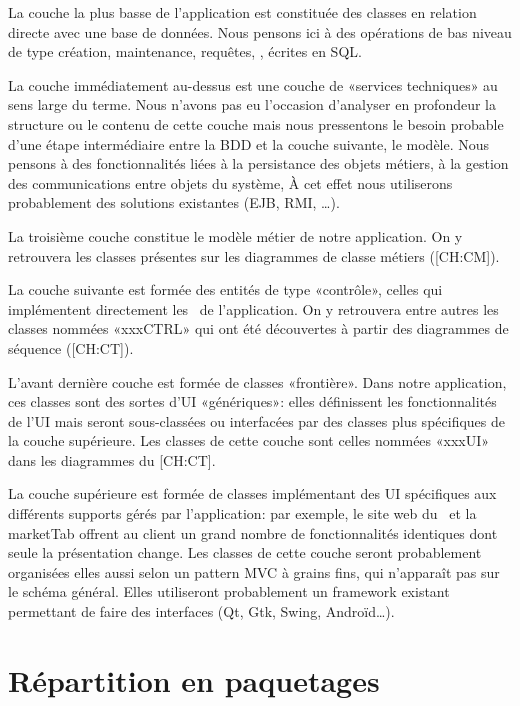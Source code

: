 \startitemize
\item La couche la plus basse de l'application est constituée des classes en relation directe avec une base de données. 
Nous pensons ici à des opérations de bas niveau de type création, maintenance, requêtes, \etc, écrites en SQL.
\item La couche immédiatement au-dessus est une couche de «services techniques» au sens large du terme.
Nous n'avons pas eu l'occasion d'analyser en profondeur la structure ou le contenu de cette couche mais nous pressentons le besoin probable d'une étape intermédiaire entre la BDD et la couche suivante, le modèle.
Nous pensons à des fonctionnalités liées à la persistance des objets métiers, à la gestion des communications entre objets du système, \etc 
À cet effet nous utiliserons probablement des solutions existantes (EJB, RMI, \dots).\par
\item La troisième couche constitue le modèle métier de notre application.
On y retrouvera les classes présentes sur les diagrammes de classe métiers ([CH:CM]).
\item La couche suivante est formée des entités de type «contrôle», \cad celles qui implémentent directement les \cu\ de l'application.
On y retrouvera entre autres les classes nommées «xxxCTRL» qui ont été découvertes à partir des diagrammes de séquence ([CH:CT]).
\item L'avant dernière couche est formée de classes «frontière». 
Dans notre application, ces classes sont des sortes d'UI «génériques»: elles définissent les fonctionnalités de l'UI mais seront sous-classées ou interfacées par des classes plus spécifiques de la couche supérieure.
Les classes de cette couche sont celles nommées «xxxUI» dans les diagrammes du [CH:CT].
\item La couche supérieure est formée de classes implémentant des UI spécifiques aux différents supports gérés par l'application: par exemple, le site web du \fm\ et la marketTab offrent au client un grand nombre de fonctionnalités identiques dont seule la présentation change.
Les classes de cette couche seront probablement organisées elles aussi selon un pattern MVC à grains fins, qui n'apparaît pas sur le schéma général.
Elles utiliseront probablement un framework existant permettant de faire des interfaces (Qt, Gtk, Swing, Androïd\dots).
\stopitemize


\section{Répartition en paquetages}

